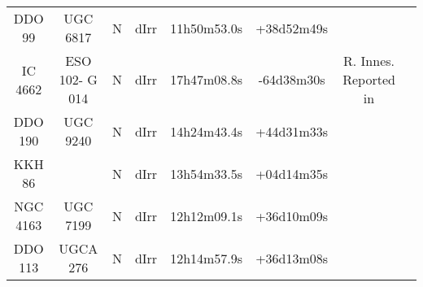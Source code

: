 \begin{table}
\begin{tabular}{cccccccc}
DDO 99                & UGC 6817                 & N & dIrr & 11h50m53.0s & +38d52m49s &\cite{vandenbergh1959}&\\
IC 4662               & ESO 102- G 014           & N & dIrr & 17h47m08.8s & -64d38m30s &R. Innes. Reported in \cite{lunt1902}&\\
DDO 190               & UGC 9240                 & N & dIrr & 14h24m43.4s & +44d31m33s &\cite{vandenbergh1959}&\\
KKH 86                &                          & N & dIrr & 13h54m33.5s & +04d14m35s &\cite{karachentsev2001b}&\\
NGC 4163              & UGC 7199                 & N & dIrr & 12h12m09.1s & +36d10m09s &\cite{herschel1789}&\\
DDO 113               & UGCA 276                 & N & dIrr & 12h14m57.9s & +36d13m08s &\cite{vandenbergh1959}&\\
\end{tabular}
\end{table}